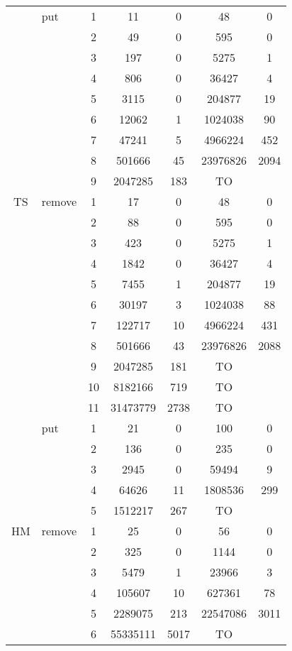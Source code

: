 \begin{tabular}{ c| l| c c c c c}
\hline
\multirow{19}{*}{TS} 
&put
  & 1 & 11  & 0 & 48  & 0 \\
& & 2 & 49  & 0 & 595 & 0 \\
& & 3 & 197 & 0 & 5275  & 1 \\
& & 4 & 806 & 0 & 36427 & 4 \\
& & 5 & 3115  & 0 & 204877  & 19  \\
& & 6 & 12062 & 1 & 1024038 & 90  \\
& & 7 & 47241 & 5 & 4966224 & 452 \\
& & 8 & 501666  & 45  & 23976826  & 2094  \\
& & 9 & 2047285 & 183 &TO  &  \\


\cline{2-7}

& remove
  & 1 & 17  & 0 & 48  & 0 \\
& & 2 & 88  & 0 & 595 & 0 \\
& & 3 & 423 & 0 & 5275  & 1 \\
& & 4 & 1842  & 0 & 36427 & 4 \\
& & 5 & 7455  & 1 & 204877  & 19  \\
& & 6 & 30197 & 3 & 1024038 & 88  \\
& & 7 & 122717  & 10  & 4966224 & 431 \\
& & 8 & 501666  & 43  & 23976826  & 2088  \\
& & 9 & 2047285 & 181 & TO    \\
& & 10  & 8182166 & 719 &    TO  \\
& & 11  & 31473779  & 2738  &  TO     \\

\hline

\multirow{11}{*}{HM} 
& put
 & 1 & 21& 0& 100 & 0 \\
& & 2 & 136& 0& 235 & 0 \\
& & 3 & 2945& 0& 59494 & 9 \\
& & 4 & 64626& 11&  1808536& 299 \\
& & 5 & 1512217& 267& TO&  \\

 \cline{2-7}

& remove
 & 1 &25 & 0& 56 & 0 \\
& & 2 &325 & 0& 1144 &  0\\
& & 3 & 5479& 1& 23966 & 3 \\
& & 4 & 105607& 10& 627361 &  78\\
& & 5 & 2289075& 213& 22547086 &3011  \\
& & 6 & 55335111 & 5017&TO &  \\


\end{tabular}
